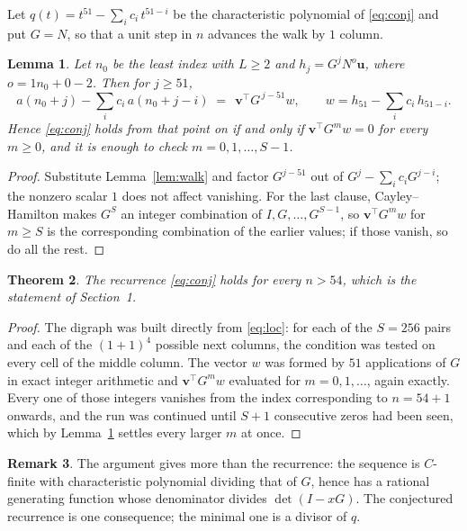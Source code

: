 \documentclass[11pt,a4paper]{article}
\theoremstyle{plain}
\newtheorem{theorem}{Theorem}
\newtheorem{lemma}[theorem]{Lemma}
\theoremstyle{definition}
\newtheorem{remark}[theorem]{Remark}
\begin{document}
Let $q(t)=t^{51}-\sum_i c_i\,t^{51-i}$ be the characteristic polynomial of
\eqref{eq:conj} and put $G=N$, so that a unit step in $n$ advances the walk by
$1$ column.

\begin{lemma}\label{lem:crit}
Let $n_0$ be the least index with $L\ge2$ and $h_j=G^{j}N^{o}\mathbf{u}$, where
$o=1n_0+0-2$. Then for $j\ge51$,
\[
a(n_0+j)-\sum_i c_i\,a(n_0+j-i)\;=\;\,\mathbf{v}^{\!\top}G^{\,j-51}w,
\qquad w=h_{51}-\sum_i c_i\,h_{51-i} .
\]
Hence \eqref{eq:conj} holds from that point on if and only if
$\mathbf{v}^{\!\top}G^{m}w=0$ for every $m\ge0$, and it is enough to check
$m=0,1,\dots,S-1$.
\end{lemma}

\begin{proof}
Substitute Lemma~\ref{lem:walk} and factor $G^{j-51}$ out of
$G^{j}-\sum_ic_iG^{j-i}$; the nonzero scalar $1$ does not affect
vanishing. For the last clause, Cayley--Hamilton makes $G^{S}$ an integer combination of
$I,G,\dots,G^{S-1}$, so $\mathbf{v}^{\!\top}G^{m}w$ for $m\ge S$ is the corresponding
combination of the earlier values; if those vanish, so do all the rest.
\end{proof}

\begin{theorem}
The recurrence \eqref{eq:conj} holds for every $n>54$, which is the statement of
Section~1.
\end{theorem}

\begin{proof}
The digraph was built directly from \eqref{eq:loc}: for each of the $S=256$ pairs and each
of the $(1+1)^{4}$ possible next columns, the condition was tested on every cell of
the middle column. The vector $w$ was formed by $51$ applications of $G$ in exact integer
arithmetic and $\mathbf{v}^{\!\top}G^{m}w$ evaluated for $m=0,1,\dots$, again exactly.
Every one of those integers vanishes from the index corresponding to $n=54+1$ onwards,
and the run was continued until $S+1$ consecutive zeros had been seen, which by
Lemma~\ref{lem:crit} settles every larger $m$ at once.
\end{proof}

\begin{remark}
The argument gives more than the recurrence: the sequence is $C$-finite with characteristic
polynomial dividing that of $G$, hence has a rational generating function whose denominator
divides $\det(I-xG)$. The conjectured recurrence is one consequence; the minimal one is a
divisor of $q$.
\end{remark}
\end{document}
